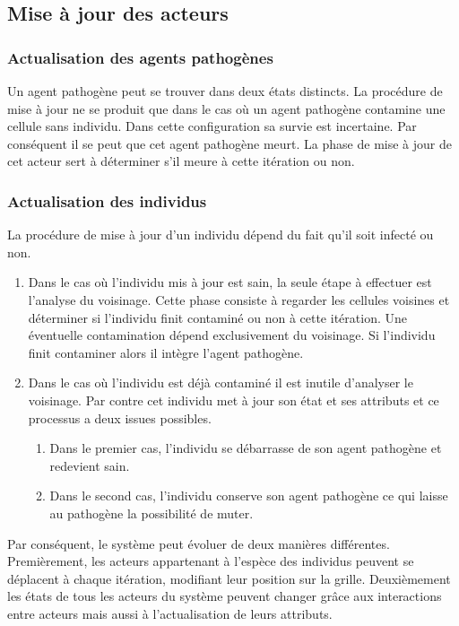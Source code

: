 \subsection{Mise à jour des acteurs}

\subsubsection{Actualisation des agents pathogènes}

Un agent pathogène peut se trouver dans deux états distincts. La procédure de mise à jour ne se produit que dans le cas où un agent pathogène contamine une cellule sans individu. Dans cette configuration sa survie est incertaine. Par conséquent il se peut que cet agent pathogène meurt. La phase de mise à jour de cet acteur sert à déterminer s'il meure à cette itération ou non.

\subsubsection{Actualisation des individus}

La procédure de mise à jour d'un individu dépend du fait qu'il soit infecté ou non.
\begin{enumerate}
	\item Dans le cas où l'individu mis à jour est sain, la seule étape à effectuer est l'analyse du voisinage. Cette phase consiste à regarder les cellules voisines et déterminer si l'individu finit contaminé ou non à cette itération. Une éventuelle contamination dépend exclusivement du voisinage. Si l'individu finit contaminer alors il intègre l'agent pathogène.
	\item Dans le cas où l'individu est déjà contaminé il est inutile d'analyser le voisinage. Par contre cet individu met à jour son état et ses attributs et ce processus a deux issues possibles.
	\begin{enumerate}
		\item Dans le premier cas, l'individu se débarrasse de son agent pathogène et redevient sain.
		\item Dans le second cas, l'individu conserve son agent pathogène ce qui laisse au pathogène la possibilité de muter.
	\end{enumerate} 
\end{enumerate}

Par conséquent, le système peut évoluer de deux manières différentes. Premièrement, les acteurs appartenant à l'espèce des individus peuvent se déplacent à chaque itération, modifiant leur position sur la grille. Deuxièmement les états de tous les acteurs du système peuvent changer grâce aux interactions entre acteurs mais aussi à l'actualisation de leurs attributs.\\

